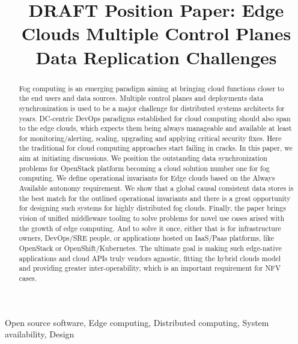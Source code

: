 \documentclass[conference]{IEEEtran}
\begin{document}
\title{DRAFT Position Paper: Edge Clouds Multiple Control Planes Data Replication
Challenges\\
}

\author{
\IEEEauthorblockA{\textit{} \\
\textit{}\\
\\
}
}

\maketitle

\begin{abstract}
Fog computing is an emerging paradigm aiming at bringing cloud functions closer
to the end users and data sources. Multiple control planes and deployments
data synchronization is used to be a major challenge for distributed systems
architects for years. DC-centric DevOps paradigms established for cloud
computing should also span to the edge clouds, which expects them being
always manageable and available at least for monitoring/alerting, scaling,
upgrading and applying critical security fixes. Here the traditional for cloud
computing approaches start failing in cracks. In this paper, we aim at
initiating discussions. We position the outstanding data synchronization
problems for OpenStack platform becoming a cloud solution number one for fog
computing. We define operational invariants for Edge clouds based on the
Always Available autonomy requirement. We show that a global causal
consistent data stores is the best match for the outlined operational
invariants and there is a great opportunity for designing such systems for
highly distributed fog clouds. Finally, the paper brings vision of unified
middleware tooling to solve problems for novel use cases arised with the
growth of edge computing. And to solve it once, either that is for
infrastructure owners, DevOps/SRE people, or applications hosted
on IaaS/Paas platforms, like OpenStack or OpenShift/Kubernetes.
The ultimate goal is making such edge-native applications and cloud APIs
truly vendors agnostic, fitting the hybrid clouds model and providing
greater inter-operability, which is an important requirement for NFV cases.
\end{abstract}

\begin{IEEEkeywords}
Open source software, Edge computing, Distributed computing, System
availability, Design
\end{IEEEkeywords}
\end{document}
